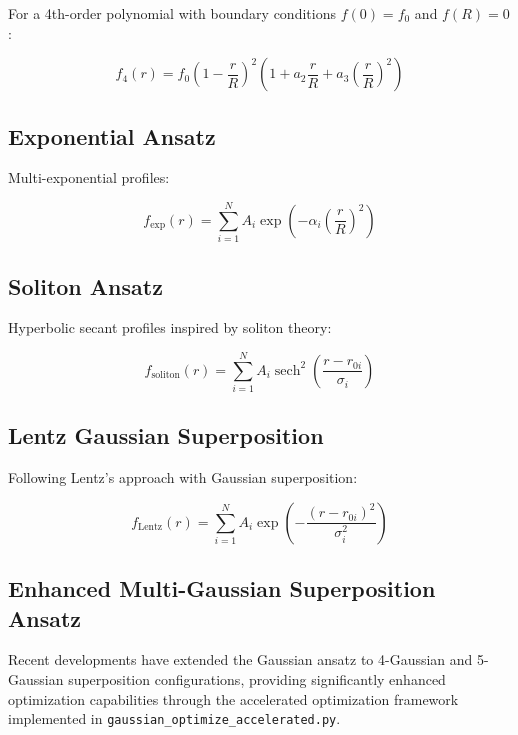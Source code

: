 \documentclass[12pt,a4paper]{article}
\begin{document}
For a 4th-order polynomial with boundary conditions $f(0) = f_0$ and $f(R) = 0$:

\begin{equation}
f_4(r) = f_0 \left(1 - \frac{r}{R}\right)^2 \left(1 + a_2 \frac{r}{R} + a_3 \left(\frac{r}{R}\right)^2\right)
\end{equation}

\subsection{Exponential Ansatz}

Multi-exponential profiles:

\begin{equation}
f_{\text{exp}}(r) = \sum_{i=1}^N A_i \exp\left(-\alpha_i \left(\frac{r}{R}\right)^2\right)
\end{equation}

\subsection{Soliton Ansatz}

Hyperbolic secant profiles inspired by soliton theory:

\begin{equation}
f_{\text{soliton}}(r) = \sum_{i=1}^N A_i \operatorname{sech}^2\left(\frac{r - r_{0i}}{\sigma_i}\right)
\end{equation}

\subsection{Lentz Gaussian Superposition}

Following Lentz's approach with Gaussian superposition:

\begin{equation}
f_{\text{Lentz}}(r) = \sum_{i=1}^N A_i \exp\left(-\frac{(r - r_{0i})^2}{\sigma_i^2}\right)
\end{equation}

\subsection{Enhanced Multi-Gaussian Superposition Ansatz}
\label{sec:multi_gaussian_ansatz}

Recent developments have extended the Gaussian ansatz to 4-Gaussian and 5-Gaussian superposition configurations, providing significantly enhanced optimization capabilities through the accelerated optimization framework implemented in \texttt{gaussian\_optimize\_accelerated.py}.
\end{document}
